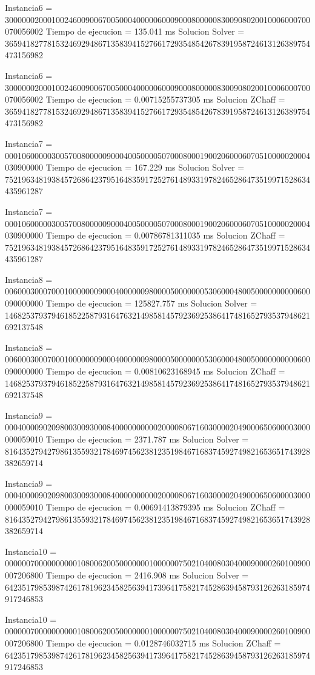 Instancia6 = 300000020001002460090067005000400000600090008000008300908020010006000700070056002
Tiempo de ejecucion = 135.041 ms
Solucion Solver = 365941827781532469294867135839415276617293548542678391958724613126389754473156982

Instancia6 = 300000020001002460090067005000400000600090008000008300908020010006000700070056002
Tiempo de ejecucion = 0.00715255737305 ms
Solucion ZChaff = 365941827781532469294867135839415276617293548542678391958724613126389754473156982

Instancia7 = 000106000003005700800000900040050000507000800019002060006070510000020004030900000
Tiempo de ejecucion = 167.229 ms
Solucion Solver = 752196348193845726864237951648359172527614893319782465286473519971528634435961287

Instancia7 = 000106000003005700800000900040050000507000800019002060006070510000020004030900000
Tiempo de ejecucion = 0.00786781311035 ms
Solucion ZChaff = 752196348193845726864237951648359172527614893319782465286473519971528634435961287

Instancia8 = 006000300070001000000090004000000980000500000005306000480050000000000600090000000
Tiempo de ejecucion = 125827.757 ms
Solucion Solver = 146825379379461852258793164763214985814579236925386417481652793537948621692137548

Instancia8 = 006000300070001000000090004000000980000500000005306000480050000000000600090000000
Tiempo de ejecucion = 0.00810623168945 ms
Solucion ZChaff = 146825379379461852258793164763214985814579236925386417481652793537948621692137548

Instancia9 = 000400009020980030093000840000000000200008067160300002049000650600003000000059010
Tiempo de ejecucion = 2371.787 ms
Solucion Solver = 816435279427986135593217846974562381235198467168374592749821653651743928382659714

Instancia9 = 000400009020980030093000840000000000200008067160300002049000650600003000000059010
Tiempo de ejecucion = 0.00691413879395 ms
Solucion ZChaff = 816435279427986135593217846974562381235198467168374592749821653651743928382659714

Instancia10 = 000000700000000001080062005000000010000007502104008030400090000260100900007206800
Tiempo de ejecucion = 2416.908 ms
Solucion Solver = 642351798539874261781962345825639417396417582174528639458793126263185974917246853

Instancia10 = 000000700000000001080062005000000010000007502104008030400090000260100900007206800
Tiempo de ejecucion = 0.0128746032715 ms
Solucion ZChaff = 642351798539874261781962345825639417396417582174528639458793126263185974917246853

